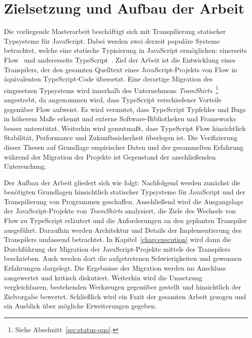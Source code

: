 \section{Zielsetzung und Aufbau der Arbeit}

Die vorliegende Masterarbeit beschäftigt sich mit Transpilierung statischer Typsysteme für JavaScript. Dabei werden zwei derzeit populäre Systeme betrachtet, welche eine statische Typisierung in JavaScript ermöglichen: einerseits Flow~\autocite{FLOW:PAPER} und andererseits TypeScript~\autocite{TYPESCRIPT_SPEC}. Ziel der Arbeit ist die Entwicklung eines Transpilers, der den gesamten Quelltext eines JavaScript-Projekts von Flow in äquivalenten TypeScript-Code übersetzt. Eine derartige Migration des eingesetzen Typsystems wird innerhalb des Unternehmens \textit{TeamShirts}~\footnote{Siehe Abschnitt~\ref{sec:status-quo}.} angestrebt, da angenommen wird, dass TypeScript verschiedener Vorteile gegenüber Flow aufweist. Es wird vermutet, dass TypeScript Typfehler und Bugs in höherem Maße erkennt und externe Software-Bibliotheken und Frameworks besser unterstützt. Weiterhin wird gemutmaßt, dass TypeScript Flow hinsichtlich Stabilität, Performance und Zukunftssicherheit überlegen ist. Die Verifizierung dieser Thesen auf Grundlage empirischer Daten und der gesammelten Erfahrung während der Migration der Projekte ist Gegenstand der anschließenden Untersuchung.

Der Aufbau der Arbeit gliedert sich wie folgt: Nachfolgend werden zunächst die benötigten Grundlagen hinsichtlich statischer Typsysteme für JavaScript und der Transpilierung von Programmen geschaffen. Anschließend wird die Ausgangslage der JavaScript-Projekte von \textit{TeamShirts} analysiert, die Ziele des Wechsels von Flow zu TypeScript erläutert und die Anforderungen an den geplanten Transpiler ausgeführt. Daraufhin werden Architektur und Details der Implementierung des Transpilers umfassend betrachtet. In Kapitel~\ref{chap:execution} wird dann die Durchführung der Migration der JavaScript-Projekte mittels des Transpilers beschrieben. Auch werden dort die aufgetretenen Schwierigkeiten und gewonnen Erfahrungen dargelegt. Die Ergebnisse der Migration werden im Anschluss ausgewertet und kritisch diskutiert. Weiterhin wird die Umsetzung vergleichbaren, bestehenden Werkzeugen gegenüber gestellt und hinsichtlich der Zielvorgabe bewertet. Schließlich wird ein Fazit der gesamten Arbeit gezogen und ein Ausblick über mögliche Erweiterungen gegeben.
